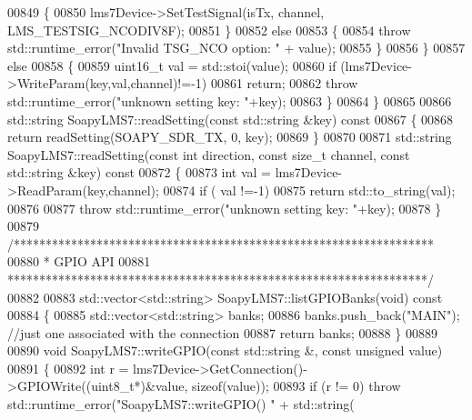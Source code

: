 \begin{DoxyCode}
{{{{{{{{{{{{{{{{{00849         \{
00850             lms7Device->SetTestSignal(isTx, channel, LMS_TESTSIG_NCODIV8F);
00851         \}
00852         \textcolor{keywordflow}{else}
00853         \{
00854             \textcolor{keywordflow}{throw} std::runtime\_error(\textcolor{stringliteral}{"Invalid TSG\_NCO option: "} + value);
00855         \}
00856     \}
00857     \textcolor{keywordflow}{else}
00858     \{
00859         uint16\_t val = std::stoi(value);
00860         \textcolor{keywordflow}{if} (lms7Device->WriteParam(key,val,channel)!=-1)
00861             \textcolor{keywordflow}{return};
00862         \textcolor{keywordflow}{throw} std::runtime\_error(\textcolor{stringliteral}{"unknown setting key: "}+key);
00863     \}
00864 \}
00865 
00866 std::string SoapyLMS7::readSetting(\textcolor{keyword}{const} std::string &key)\textcolor{keyword}{ const}
00867 \textcolor{keyword}{}\{
00868     \textcolor{keywordflow}{return} readSetting(SOAPY\_SDR\_TX, 0, key);
00869 \}
00870     
00871 std::string SoapyLMS7::readSetting(\textcolor{keyword}{const} \textcolor{keywordtype}{int} direction, \textcolor{keyword}{const} \textcolor{keywordtype}{size\_t} channel, \textcolor{keyword}{const} std::string &key)\textcolor{keyword}{ const}
00872 \textcolor{keyword}{}\{
00873     \textcolor{keywordtype}{int} val = lms7Device->ReadParam(key,channel);
00874     \textcolor{keywordflow}{if} ( val !=-1)
00875         \textcolor{keywordflow}{return} std::to\_string(val);
00876     
00877     \textcolor{keywordflow}{throw} std::runtime\_error(\textcolor{stringliteral}{"unknown setting key: "}+key);
00878 \}
00879 \textcolor{comment}{/******************************************************************}
00880 \textcolor{comment}{ * GPIO API}
00881 \textcolor{comment}{ ******************************************************************/}
00882 
00883 std::vector<std::string> SoapyLMS7::listGPIOBanks(\textcolor{keywordtype}{void})\textcolor{keyword}{ const}
00884 \textcolor{keyword}{}\{
00885     std::vector<std::string> banks;
00886     banks.push\_back(\textcolor{stringliteral}{"MAIN"}); \textcolor{comment}{//just one associated with the connection}
00887     \textcolor{keywordflow}{return} banks;
00888 \}
00889 
00890 \textcolor{keywordtype}{void} SoapyLMS7::writeGPIO(\textcolor{keyword}{const} std::string &, \textcolor{keyword}{const} \textcolor{keywordtype}{unsigned} value)
00891 \{
00892     \textcolor{keywordtype}{int} r = lms7Device->GetConnection()->GPIOWrite((uint8\_t*)&value, \textcolor{keyword}{sizeof}(value));
00893     \textcolor{keywordflow}{if} (r != 0) \textcolor{keywordflow}{throw} std::runtime\_error(\textcolor{stringliteral}{"SoapyLMS7::writeGPIO() "} + std::string(
}}}}}}}}}}}}}}}}}
\end{DoxyCode}
